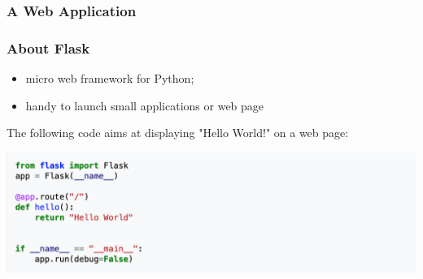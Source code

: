 \begin{frame}
  \frametitle{A Web Application}
\end{frame}

\begin{frame}
  \frametitle{About Flask}

  \begin{itemize}
    \item micro web framework for Python;
    \item handy to launch small applications or web page
  \end{itemize}

The following code aims at displaying "Hello World!" on a web page: 

  \includegraphics[scale=0.4]{../inc/graphics/flask.png}

\end{frame}
